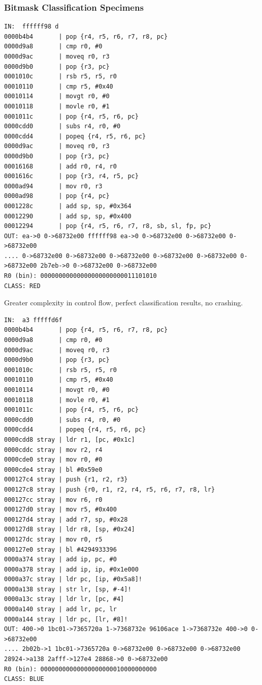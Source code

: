 \documentclass[11pt]{article}
\begin{document}
\subsubsection*{Bitmask Classification Specimens}
\label{sec:orgb606158}
\begin{verbatim}
IN:  ffffff98 d
0000b4b4       | pop {r4, r5, r6, r7, r8, pc}
0000d9a8       | cmp r0, #0
0000d9ac       | moveq r0, r3
0000d9b0       | pop {r3, pc}
0001010c       | rsb r5, r5, r0
00010110       | cmp r5, #0x40
00010114       | movgt r0, #0
00010118       | movle r0, #1
0001011c       | pop {r4, r5, r6, pc}
0000cdd0       | subs r4, r0, #0
0000cdd4       | popeq {r4, r5, r6, pc}
0000d9ac       | moveq r0, r3
0000d9b0       | pop {r3, pc}
00016168       | add r0, r4, r0
0001616c       | pop {r3, r4, r5, pc}
0000ad94       | mov r0, r3
0000ad98       | pop {r4, pc}
0001228c       | add sp, sp, #0x364
00012290       | add sp, sp, #0x400
00012294       | pop {r4, r5, r6, r7, r8, sb, sl, fp, pc}
OUT: ea->0 0->68732e00 ffffff98 ea->0 0->68732e00 0->68732e00 0->68732e00 
.... 0->68732e00 0->68732e00 0->68732e00 0->68732e00 0->68732e00 0->68732e00 2b7eb->0 0->68732e00 0->68732e00 
R0 (bin): 00000000000000000000000011101010
CLASS: RED
\end{verbatim}
Greater complexity in control flow, perfect classification results, no crashing.
\begin{verbatim}
IN:  a3 fffffd6f
0000b4b4       | pop {r4, r5, r6, r7, r8, pc}
0000d9a8       | cmp r0, #0
0000d9ac       | moveq r0, r3
0000d9b0       | pop {r3, pc}
0001010c       | rsb r5, r5, r0
00010110       | cmp r5, #0x40
00010114       | movgt r0, #0
00010118       | movle r0, #1
0001011c       | pop {r4, r5, r6, pc}
0000cdd0       | subs r4, r0, #0
0000cdd4       | popeq {r4, r5, r6, pc}
0000cdd8 stray | ldr r1, [pc, #0x1c]
0000cddc stray | mov r2, r4
0000cde0 stray | mov r0, #0
0000cde4 stray | bl #0x59e0
000127c4 stray | push {r1, r2, r3}
000127c8 stray | push {r0, r1, r2, r4, r5, r6, r7, r8, lr}
000127cc stray | mov r6, r0
000127d0 stray | mov r5, #0x400
000127d4 stray | add r7, sp, #0x28
000127d8 stray | ldr r8, [sp, #0x24]
000127dc stray | mov r0, r5
000127e0 stray | bl #4294933396
0000a374 stray | add ip, pc, #0
0000a378 stray | add ip, ip, #0x1e000
0000a37c stray | ldr pc, [ip, #0x5a8]!
0000a138 stray | str lr, [sp, #-4]!
0000a13c stray | ldr lr, [pc, #4]
0000a140 stray | add lr, pc, lr
0000a144 stray | ldr pc, [lr, #8]!
OUT: 400->0 1bc01->7365720a 1->7368732e 96106ace 1->7368732e 400->0 0->68732e00 
.... 2b02b->1 1bc01->7365720a 0->68732e00 0->68732e00 0->68732e00 28924->a138 2afff->127e4 28868->0 0->68732e00 
R0 (bin): 00000000000000000000010000000000
CLASS: BLUE
\end{verbatim}
\end{document}
